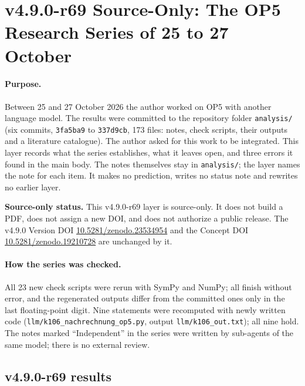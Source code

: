 \clearpage
\section*{v4.9.0-r69 Source-Only: The OP5 Research Series of 25 to 27 October}
\label{sec:v490-r69-op5-series}

\paragraph{Purpose.}
Between 25 and 27 October 2026 the author worked on OP5 with another language model.  The results were committed to the repository folder
\texttt{analysis/} (six commits, \texttt{3fa5ba9} to \texttt{337d9cb}, 173 files: notes, check scripts, their outputs and a literature catalogue).
The author asked for this work to be integrated.  This layer records what the series establishes, what it leaves open, and three errors it found in
the main body.  The notes themselves stay in \texttt{analysis/}; the layer names the note for each item.  It makes no prediction, writes no status
note and rewrites no earlier layer.

\noindent\textbf{Source-only status.}
This v4.9.0-r69 layer is source-only.  It does not build a PDF, does not assign a new DOI,
and does not authorize a public release.  The v4.9.0 Version DOI
\href{https://doi.org/10.5281/zenodo.23534954}{10.5281/zenodo.23534954} and the Concept DOI
\href{https://doi.org/10.5281/zenodo.19210728}{10.5281/zenodo.19210728} are unchanged by it.

\paragraph{How the series was checked.}
All 23 new check scripts were rerun with SymPy and NumPy; all finish without error, and the regenerated outputs differ from the committed ones only in the
last floating-point digit.  Nine statements were recomputed with newly written code (\texttt{llm/k106\_nachrechnung\_op5.py}, output
\texttt{llm/k106\_out.txt}); all nine hold.  The notes marked ``Independent'' in the series were written by sub-agents of the same model; there is no
external review.

\subsection*{v4.9.0-r69 results}
\label{subsec:v490-r69-results}

